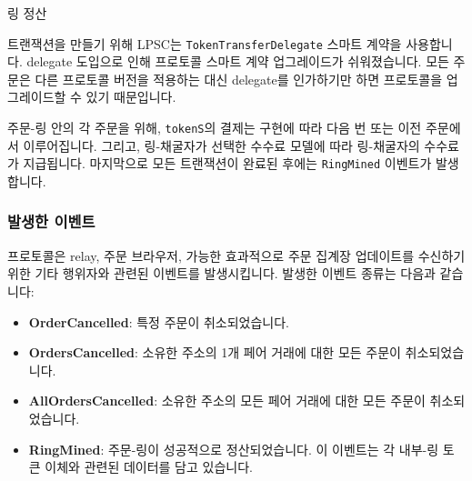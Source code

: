 \documentclass[UTF8,nofonts]{article}
\makeatletter
\newenvironment{figurehere}
 {\def\@captype{figure}}
 {}
\makeatother
\begin{document}
\begin{multicols}{2}
\begin{center}
\begin{figurehere}
\caption{링 정산}
\label{fig:settlement}
\end{figurehere}
\end{center}

트랜잭션을 만들기 위해 LPSC는 \verb|TokenTransferDelegate| 스마트 계약을 사용합니다. delegate 도입으로 인해 프로토콜 스마트 계약 업그레이드가 쉬워졌습니다. 모든 주문은 다른 프로토콜 버전을 적용하는 대신 delegate를 인가하기만 하면 프로토콜을 업그레이드할 수 있기 때문입니다.

주문-링 안의 각 주문을 위해, \verb|tokenS|의 결제는 구현에 따라 다음 번 또는 이전 주문에서 이루어집니다. 그리고, 링-채굴자가 선택한 수수료 모델에 따라 링-채굴자의 수수료가 지급됩니다. 마지막으로 모든 트랜잭션이 완료된 후에는 \verb|RingMined| 이벤트가 발생합니다.  

\subsubsection{발생한 이벤트\label{sec:events}}
프로토콜은 relay, 주문 브라우저, 가능한 효과적으로 주문 집계장 업데이트를 수신하기 위한 기타 행위자와 관련된 이벤트를 발생시킵니다. 발생한 이벤트 종류는 다음과 같습니다:

\begin{itemize}
	\item \textbf{OrderCancelled}: 특정 주문이 취소되었습니다.
	\item \textbf{OrdersCancelled}: 소유한 주소의 1개 페어 거래에 대한 모든 주문이 취소되었습니다.
	\item \textbf{AllOrdersCancelled}: 소유한 주소의 모든 페어 거래에 대한 모든 주문이 취소되었습니다.
	\item \textbf{RingMined}: 주문-링이 성공적으로 정산되었습니다. 이 이벤트는 각 내부-링 토큰 이체와 관련된 데이터를 담고 있습니다.
\end{itemize}



\end{multicols}
\end{document}
